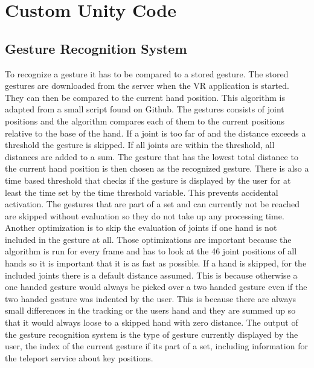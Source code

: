 \chapter{Custom Unity Code}

\section{Gesture Recognition System}
To recognize a gesture it has to be compared to a stored gesture. The stored gestures are downloaded from the server when the VR application is started. They can then be compared to the current hand position. This algorithm is adapted from a small script found on Github.  %
The gestures consists of joint positions and the algorithm compares each of them to the current positions relative to the base of the hand. If a joint is too far of and the distance exceeds a threshold the gesture is skipped. If all joints are within the threshold, all distances are added to a sum. The gesture that has the lowest total distance to the current hand position is then chosen as the recognized gesture. There is also a time based threshold that checks if the gesture is displayed by the user for at least the time set by the time threshold variable. This prevents accidental activation. The gestures that are part of a set and can currently not be reached are skipped without evaluation so they do not take up any processing time. Another optimization is to skip the evaluation of joints if one hand is not included in the gesture at all. Those optimizations are important because the algorithm is run for every frame and has to look at the 46 joint positions of all hands so it is important that it is as fast as possible.
If a hand is skipped, for the included joints there is a default distance assumed. This is because otherwise a one handed gesture would always be picked over a two handed gesture even if the two handed gesture was indented by the user. This is because there are always small differences in the tracking or the users hand and they are summed up so that it would always loose to a skipped hand with zero distance. 
The output of the gesture recognition system is the type of gesture currently displayed by the user, the index of the current gesture if its part of a set, including information for the teleport service about key positions.

